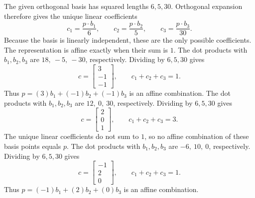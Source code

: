 The given orthogonal basis has squared lengths $6,5,30$. Orthogonal expansion therefore gives the unique linear coefficients
\[c_1=\frac{p\cdot b_1}{6},\qquad c_2=\frac{p\cdot b_2}{5},\qquad c_3=\frac{p\cdot b_3}{30}.\]
Because the basis is linearly independent, these are the only possible coefficients. The representation is affine exactly when their sum is $1$.
The dot products with $b_1,b_2,b_3$ are $18,\ -5,\ -30$, respectively. Dividing by $6,5,30$ gives
\[c=\begin{bmatrix}3\\-1\\-1\end{bmatrix},\qquad c_1+c_2+c_3=1.\]
Thus $p=(3)b_1+(-1)b_2+(-1)b_3$ is an affine combination.
The dot products with $b_1,b_2,b_3$ are $12,\ 0,\ 30$, respectively. Dividing by $6,5,30$ gives
\[c=\begin{bmatrix}2\\0\\1\end{bmatrix},\qquad c_1+c_2+c_3=3.\]
The unique linear coefficients do not sum to $1$, so no affine combination of these basis points equals $p$.
The dot products with $b_1,b_2,b_3$ are $-6,\ 10,\ 0$, respectively. Dividing by $6,5,30$ gives
\[c=\begin{bmatrix}-1\\2\\0\end{bmatrix},\qquad c_1+c_2+c_3=1.\]
Thus $p=(-1)b_1+(2)b_2+(0)b_3$ is an affine combination.


